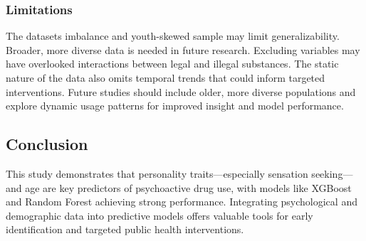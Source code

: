 \documentclass{article}
\begin{document}
\subsubsection*{Limitations}
The datasets imbalance and youth-skewed sample may limit generalizability. Broader, more diverse data is needed in future research. Excluding variables may have overlooked interactions between legal and illegal substances. The static nature of the data also omits temporal trends that could inform targeted interventions. Future studies should include older, more diverse populations and explore dynamic usage patterns for improved insight and model performance.

\subsection*{Conclusion}

This study demonstrates that personality traits—especially sensation seeking—and age are key predictors of psychoactive drug use, with models like XGBoost and Random Forest achieving strong performance. Integrating psychological and demographic data into predictive models offers valuable tools for early identification and targeted public health interventions.
\end{document}
